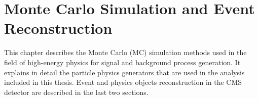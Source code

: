 \graphicspath{{chapt_dutch/}{intro/}{chapt2/}{chapt3/}{chapt4/}{chapt5/}{chapt6/}{chapt7/}{chapt8/}}

\renewcommand\evenpagerightmark{{\scshape\small Chapter 5}}
\renewcommand\oddpageleftmark{{\scshape\small Monte Carlo Simulation and Event Reconstruction}}

\renewcommand{\bibname}{References}

\hyphenation{}

\chapter[Monte Carlo simulation and event reconstruction]%
{Monte Carlo Simulation and Event Reconstruction}\label{chapt:5}
This chapter describes the Monte Carlo (MC) simulation methods used in the field of high-energy physics for signal and background process generation. It explains in detail the particle physics generators that are used in the analysis included in this thesis. Event and physics objects reconstruction in the CMS detector are described in the last two sections. 
